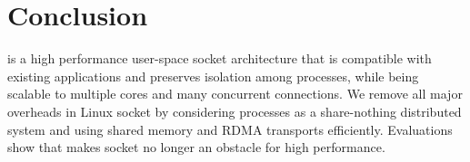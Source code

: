 \section{Conclusion}
\label{sec:conclusion}

\sys is a high performance user-space socket architecture that is compatible with existing applications and preserves isolation among processes, while being scalable to multiple cores and many concurrent connections. We remove all major overheads in Linux socket by considering processes as a share-nothing distributed system and using shared memory and RDMA transports efficiently. Evaluations show that \sys makes socket no longer an obstacle for high performance.